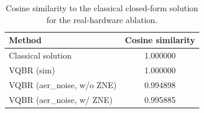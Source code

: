\begin{table}[t]
\caption{Cosine similarity to the classical closed-form solution for the real-hardware ablation.}
\label{tab:real_hardware_cosine}
\centering
\scriptsize
\begin{tabular}{@{}lc@{}}
\toprule
Method & Cosine similarity \\
\midrule
Classical solution & 1.000000 \\
VQBR (sim) & 1.000000 \\
VQBR (aer\_noise, w/o ZNE) & 0.994898 \\
VQBR (aer\_noise, w/ ZNE) & 0.995885 \\
\bottomrule
\end{tabular}
\end{table}
